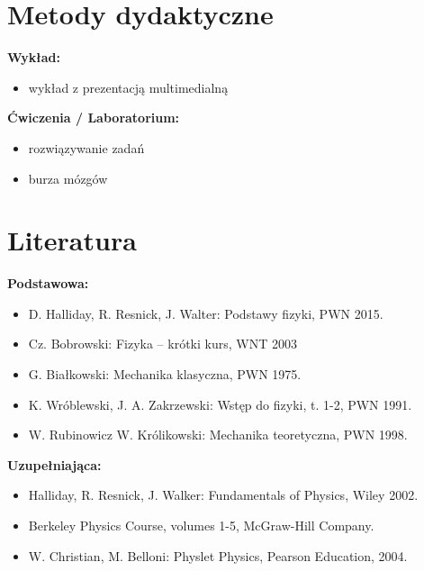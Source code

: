 \documentclass[12pt, a4paper]{article}
\begin{document}
\section{Metody dydaktyczne}

\textbf{Wykład:}
\begin{itemize}
  \item wykład z prezentacją multimedialną
\end{itemize}
\vspace{4pt}
\textbf{Ćwiczenia / Laboratorium:}
\begin{itemize}
  \item rozwiązywanie zadań
  \item burza mózgów
\end{itemize}
\vspace{4pt}


\section{Literatura}

\textbf{Podstawowa:}
\begin{itemize}
  \item D. Halliday, R. Resnick, J. Walter: Podstawy fizyki, PWN 2015.
  \item Cz. Bobrowski: Fizyka – krótki kurs, WNT 2003
  \item G. Białkowski: Mechanika klasyczna, PWN 1975.
  \item K. Wróblewski, J. A. Zakrzewski: Wstęp do fizyki, t. 1-2, PWN 1991.
  \item W. Rubinowicz W. Królikowski: Mechanika teoretyczna, PWN 1998.
\end{itemize}

\textbf{Uzupełniająca:}
\begin{itemize}
  \item Halliday, R. Resnick, J. Walker: Fundamentals of Physics, Wiley 2002.
  \item Berkeley Physics Course, volumes 1-5, McGraw-Hill Company.
  \item W. Christian, M. Belloni: Physlet Physics, Pearson Education, 2004.
\end{itemize}
\end{document}
